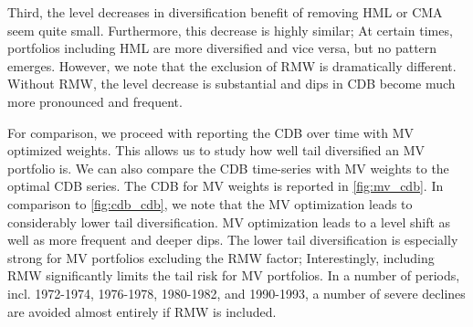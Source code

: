 Third, the level decreases in diversification benefit of removing HML or CMA seem quite small. Furthermore, this decrease is highly similar; At certain times, portfolios including HML are more diversified and vice versa, but no pattern emerges. However, we note that the exclusion of RMW is dramatically different. Without RMW, the level decrease is substantial and dips in CDB become much more pronounced and frequent. 

For comparison, we proceed with reporting the CDB over time with MV optimized weights. This allows us to study how well tail diversified an MV portfolio is. We can also compare the CDB time-series with MV weights to the optimal CDB series. The CDB for MV weights is reported in \autoref{fig:mv_cdb}. In comparison to \autoref{fig:cdb_cdb}, we note that the MV optimization leads to considerably lower tail diversification. MV optimization leads to a level shift as well as more frequent and deeper dips. The lower tail diversification is especially strong for MV portfolios excluding the RMW factor; Interestingly, including RMW significantly limits the tail risk for MV portfolios. In a number of periods, incl. 1972-1974, 1976-1978, 1980-1982, and 1990-1993, a number of severe declines are avoided almost entirely if RMW is included. 

